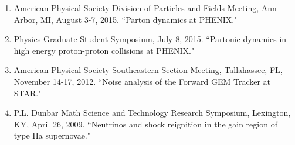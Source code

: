 \documentclass[11pt]{article}
\begin{document}
\begin{flushleft}
\begin{enumerate}
		\item American Physical Society Division of Particles and Fields Meeting, Ann Arbor, MI, August 3-7, 2015. ``Parton dynamics at PHENIX." 
		
		\item Physics Graduate Student Symposium, July 8, 2015.  ``Partonic dynamics in high energy proton-proton collisions at PHENIX." 
		
		\item American Physical Society Southeastern Section Meeting, Tallahassee, FL, November 14-17, 2012.  ``Noise analysis of the Forward GEM Tracker at STAR." 
		
		\item P.L. Dunbar Math Science and Technology Research Symposium, Lexington, KY, April 26, 2009. ``Neutrinos and shock reignition in the gain region of type IIa supernovae."
	\end{enumerate}
	
\end{flushleft}

\vspace{7pt}




\end{document}

